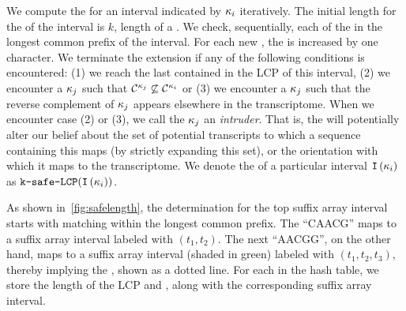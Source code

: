 We compute the \kslcp for an interval indicated by \kmer ${\kappa}_i$ iteratively. The 
initial length for the \kslcp of the interval is $k$, length of a \kmer. We check, 
sequentially, each of the \kmers in the longest common prefix of the interval. For each 
new \kmer, the \kslcp is increased by one character. We terminate the \kslcp extension if 
any of the following conditions is encountered: (1) we reach the last \kmer contained 
in the LCP of this interval, (2) we encounter a \kmer ${\kappa}_j$ such that 
$\mathcal{C}^{{\kappa}_j} \not \subseteq \mathcal{C}^{{\kappa}_i}$ or (3) we 
encounter a \kmer ${\kappa}_j$ such that the reverse complement of ${\kappa}_j$ 
appears elsewhere in the transcriptome. When we encounter case (2) or (3), we call the 
\kmer ${\kappa}_j$ an \emph{intruder}.  That is, the \kmer will potentially alter our 
belief about the set of potential transcripts to which a sequence containing this \kmer 
maps (by strictly expanding this set), or the orientation with which it maps to the 
transcriptome.  We denote the \kslcp of a particular interval $\texttt{I}\left({\kappa}_i\right)$ 
as $\mathrm{\texttt{k-safe-LCP}}(\texttt{I}\left({\kappa}_i\right))$.

As shown in~\cref{fig:safelength}, the \kslcp determination for the top suffix 
array interval starts with matching \kmers within the longest common prefix. The 
\kmer ``CAACG'' maps to a suffix array interval labeled with $(t_1,t_2)$. The next 
\kmer ``AACGG'', on the other hand, maps to a suffix array interval (shaded in green) 
labeled with $(t_1,t_2,t_3)$, thereby implying the \kslcp, shown as a dotted line. For 
each \kmer in the hash table, we store the length of the LCP and \kslcp, along with 
the corresponding suffix array interval.

